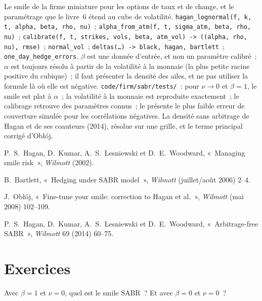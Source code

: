 \begin{build}
 Le smile de la firme miniature pour les options de taux et de change, et le paramétrage que le
livre~6 étend au cube de volatilité.
 \texttt{hagan\_lognormal(f, k, t, alpha, beta, rho, nu)}~; \texttt{alpha\_from\_atm(f, t,
sigma\_atm, beta, rho, nu)}~; \texttt{calibrate(f, t, strikes, vols, beta, atm\_vol) -> ((alpha, rho, nu), rmse)}~;
\texttt{normal\_vol}~; \texttt{deltas(\ldots) -> black, hagan, bartlett}~; \texttt{one\_day\_hedge\_errors}.
 $\beta$ est une donnée d'entrée, et non un paramètre calibré~; $\alpha$ est toujours résolu à partir de la volatilité à la monnaie
(la plus petite racine positive du cubique)~; il faut présenter la densité des ailes, et ne pas utiliser la formule là où elle est
négative.
 \texttt{code/firm/sabr/tests/}~: pour $\nu\to0$ et $\beta=1$, le smile est plat à $\alpha$~; la
volatilité à la monnaie est reproduite exactement~; le calibrage retrouve des paramètres connus~; le  présente le
plus faible erreur de couverture simulée pour les corrélations négatives.
 La densité sans arbitrage de Hagan et de ses coauteurs (2014), résolue sur une grille, et le terme
principal corrigé d'Obłój.
\end{build}

\begin{omsources}
\item P.~S.~Hagan, D.~Kumar, A.~S.~Lesniewski et D.~E.~Woodward, «~Managing smile risk~», \emph{Wilmott} (2002).
\item B.~Bartlett, «~Hedging under SABR model~», \emph{Wilmott} (juillet/août 2006) 2--4.
\item J.~Obłój, «~Fine-tune your smile: correction to Hagan et al.~», \emph{Wilmott} (mai 2008) 102--109.
\item P.~S.~Hagan, D.~Kumar, A.~S.~Lesniewski et D.~E.~Woodward, «~Arbitrage-free SABR~», \emph{Wilmott} 69 (2014)
60--75.
\end{omsources}

\section{Exercices}

\begin{exercise}[$\star$]\label{exo:dv:sabr-and-smile-dynamics:1}
Avec $\beta=1$ et $\nu=0$, quel est le smile SABR~? Et avec $\beta=0$ et $\nu=0$~?
\end{exercise}

